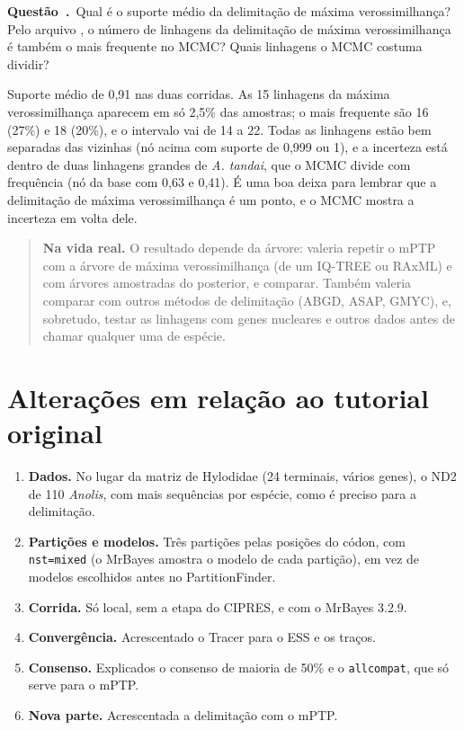 \documentclass[11pt,a4paper]{article}
\newcommand{\arq}[1]{\path{#1}}
\newcommand{\cmd}[1]{\texttt{#1}}
\newcounter{questao}
\newcommand{\questao}{\par\needspace{3\baselineskip}\refstepcounter{questao}\noindent\textbf{Questão~\thequestao.}\ }
\begin{document}
\questao Qual é o suporte médio da delimitação de máxima verossimilhança? Pelo arquivo
\arq{.stats}, o número de linhagens da delimitação de máxima verossimilhança é também o mais
frequente no MCMC? Quais linhagens o MCMC costuma dividir?

\begin{resposta}
Suporte médio de 0,91 nas duas corridas. As 15 linhagens da máxima verossimilhança aparecem em
só 2,5\% das amostras; o mais frequente são 16 (27\%) e 18 (20\%), e o intervalo vai de 14 a 22.
Todas as linhagens estão bem separadas das vizinhas (nó acima com suporte de 0,999 ou 1), e a
incerteza está dentro de duas linhagens grandes de \emph{A. tandai}, que o MCMC divide com
frequência (nó da base com 0,63 e 0,41). É uma boa deixa para lembrar que a delimitação de
máxima verossimilhança é um ponto, e o MCMC mostra a incerteza em volta dele.
\end{resposta}

\begin{quote}\small
\textbf{Na vida real.} O resultado depende da árvore: valeria repetir o mPTP com a árvore de
máxima verossimilhança (de um IQ-TREE ou RAxML) e com árvores amostradas do posterior, e
comparar. Também valeria comparar com outros métodos de delimitação (ABGD, ASAP, GMYC), e,
sobretudo, testar as linhagens com genes nucleares e outros dados antes de chamar qualquer uma
de espécie.
\end{quote}

\appendix
\section{Alterações em relação ao tutorial original}\label{ap:mudancas}

\begin{enumerate}
\item \textbf{Dados.} No lugar da matriz de Hylodidae (24 terminais, vários genes), o ND2 de 110
\emph{Anolis}, com mais sequências por espécie, como é preciso para a delimitação.
\item \textbf{Partições e modelos.} Três partições pelas posições do códon, com
\cmd{nst=mixed} (o MrBayes amostra o modelo de cada partição), em vez de modelos escolhidos
antes no PartitionFinder.
\item \textbf{Corrida.} Só local, sem a etapa do CIPRES, e com o MrBayes 3.2.9.
\item \textbf{Convergência.} Acrescentado o Tracer para o ESS e os traços.
\item \textbf{Consenso.} Explicados o consenso de maioria de 50\% e o \cmd{allcompat}, que só
serve para o mPTP.
\item \textbf{Nova parte.} Acrescentada a delimitação com o mPTP.
\end{enumerate}
\end{document}
